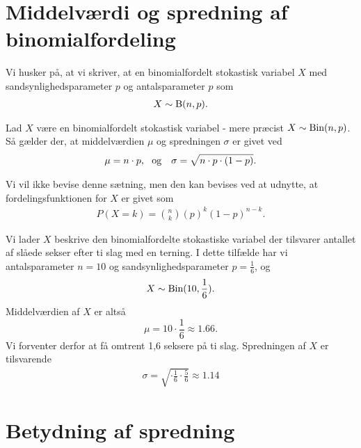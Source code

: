 \section*{Middelværdi og spredning af binomialfordeling}
Vi husker på, at vi skriver, at en binomialfordelt stokastisk variabel $X$ med sandsynlighedsparameter $p$ og antalsparameter $p$ som
\begin{align*}
X \sim \textnormal{B}(n,p).
\end{align*}

\begin{setn}
Lad $X$ være en binomialfordelt stokastisk variabel - mere præcist $X \sim \textnormal{Bin}(n,p)$. Så gælder der, at middelværdien $\mu$ og spredningen $\sigma$ er givet ved
\begin{align*}
 \mu &= n\cdot p,\ \textnormal{ og}
&\sigma = \sqrt{n\cdot p\cdot (1-p)}. 
\end{align*} 
\end{setn}
Vi vil ikke bevise denne sætning, men den kan bevises ved at udnytte, at fordelingsfunktionen for $X$ er givet som
\begin{align*}
P(X = k) = \binom{n}{k}(p)^k(1-p)^{n-k}.
\end{align*}
\begin{exa}
Vi lader $X$ beskrive den binomialfordelte stokastiske variabel der tilsvarer antallet af slåede sekser efter ti slag med en terning. I dette tilfælde har vi antalsparameter $n = 10$ og sandsynlighedsparameter $p = \frac{1}{6}$, og 
\begin{align*}
X \sim \textnormal{Bin}(10,\frac{1}{6}). 
\end{align*}
Middelværdien af $X$ er altså
\[
\mu = 10\cdot \frac{1}{6} \approx 1.66.
\]
Vi forventer derfor at få omtrent 1,6 seksere på ti slag.
Spredningen af $X$ er tilsvarende
\begin{align*}
\sigma = \sqrt{\cdot \frac{1}{6}\cdot \frac{5}{6}} \approx 1.14
\end{align*}
\end{exa}

\section*{Betydning af spredning}

